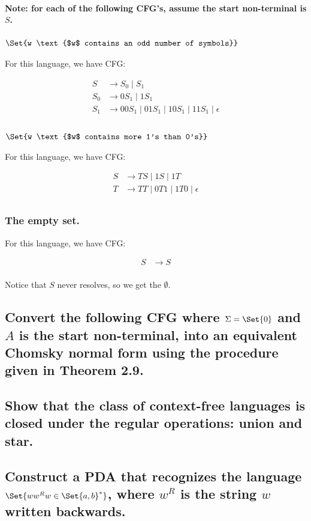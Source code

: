 \documentclass{article}
\providecommand\given{} %
\begin{document}
\paragraph{Note: for each of the following CFG's, assume the start non-terminal is $S$.}

\subsubsection{$\Set{w \given \text{$w$ contains an odd number of symbols}}$}

For this language, we have CFG:

\begin{align*}
	S &\longrightarrow S_0 \;|\; S_1 \\
	S_0 &\longrightarrow 0S_1 \;|\; 1S_1 \\
	S_1 &\longrightarrow 00S_1 \;|\; 01S_1 \;|\; 10S_1 \;|\; 11S_1 \;|\; \epsilon \\
\end{align*}

\subsubsection{$\Set{w \given \text{$w$ contains more 1's than 0's}}$}

For this language, we have CFG:

\begin{align*}
	S &\longrightarrow TS \;|\; 1S \;|\; 1T \\
	T &\longrightarrow TT \;|\; 0T1 \;|\; 1T0 \;|\; \epsilon \\
\end{align*}

\subsubsection{The empty set.}

For this language, we have CFG:

\begin{align*}
	S &\longrightarrow S \\
\end{align*}

Notice that $S$ never resolves, so we get the $\emptyset$.


\subsection{Convert the following CFG where $\Sigma = \Set{0}$ and $A$ is the start non-terminal, into an equivalent Chomsky normal form using the procedure given in Theorem 2.9.}

\subsection{Show that the class of context-free languages is closed under the regular operations: union and star.}

\subsection{Construct a PDA that recognizes the language $\Set{ww^R \given w \in \Set{a,b}^*}$, where $w^R$ is the string $w$ written backwards.}
\end{document}
